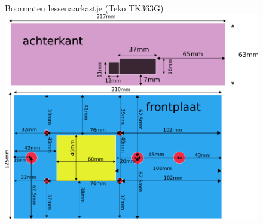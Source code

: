 \documentclass[12pt,a4paper]{report}
\begin{document}
\begin{figure}[!ht]
  \captionbox
  {Boormaten lessenaarkastje (Teko TK363G)}
  {\includegraphics[scale=0.7]{images/inbouwmaten_centralekast}}
\end{figure}
\end{document}
